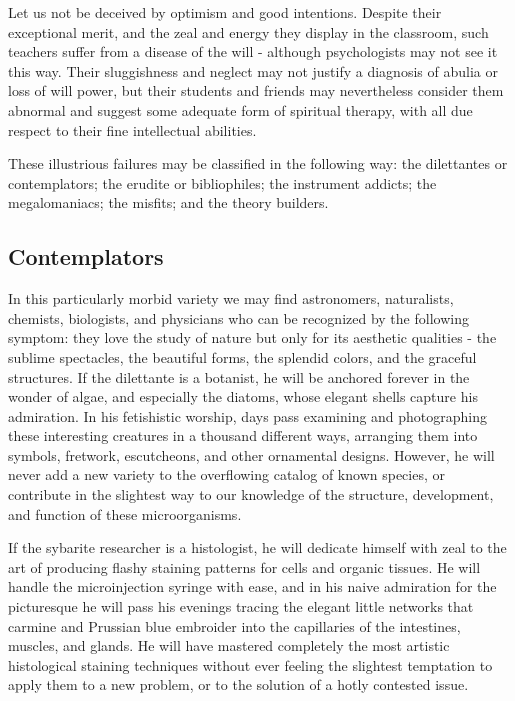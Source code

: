 \documentclass{article}
\begin{document}
Let us not be deceived by optimism and good intentions. Despite their exceptional merit, and the zeal and energy they display in the classroom, such teachers suffer from a disease of the will - although psychologists may not see it this way. Their sluggishness and neglect may not justify a diagnosis of abulia or loss of will power, but their students and friends may nevertheless consider them abnormal and suggest some adequate form of spiritual therapy, with all due respect to their fine intellectual abilities.

These illustrious failures may be classified in the following way: the dilettantes or contemplators; the erudite or bibliophiles; the instrument addicts; the megalomaniacs; the misfits; and the theory builders.

\subsection*{Contemplators}

In this particularly morbid variety we may find astronomers, naturalists, chemists, biologists, and physicians who can be recognized by the following symptom: they love the study of nature but only for its aesthetic qualities - the sublime spectacles, the beautiful forms, the splendid colors, and the graceful structures. If the dilettante is a botanist, he will be anchored forever in the wonder of algae, and especially the diatoms, whose elegant shells capture his admiration. In his fetishistic worship, days pass examining and photographing these interesting creatures in a thousand different ways, arranging them into symbols, fretwork, escutcheons, and other ornamental designs. However, he will never add a new variety to the overflowing catalog of known species, or contribute in the slightest way to our knowledge of the structure, development, and function of these microorganisms.

If the sybarite researcher is a histologist, he will dedicate himself with zeal to the art of producing flashy staining patterns for cells and organic tissues. He will handle the microinjection syringe with ease, and in his naive admiration for the picturesque he will pass his evenings tracing the elegant little networks that carmine and Prussian blue embroider into the capillaries of the intestines, muscles, and glands. He will have mastered completely the most artistic histological staining techniques without ever feeling the slightest temptation to apply them to a new problem, or to the solution of a hotly contested issue.
\end{document}
